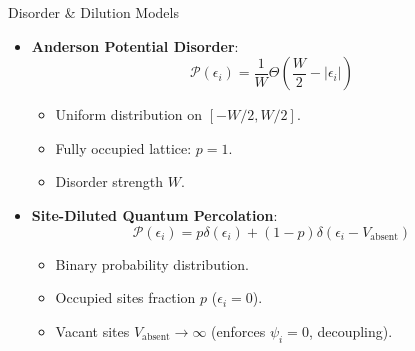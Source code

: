 \documentclass[10pt,aspectratio=169]{beamer}
\begin{document}
\begin{frame}{Disorder \& Dilution Models}
  \begin{itemize}
    \item \textbf{Anderson Potential Disorder}:
      \begin{equation}
      \mathcal{P}(\epsilon_i) = \frac{1}{W} \Theta\left(\frac{W}{2} - |\epsilon_i|\right)
      \end{equation}
      \begin{itemize}
        \item Uniform distribution on $[-W/2, W/2]$.
        \item Fully occupied lattice: $p=1$.
        \item Disorder strength $W$.
      \end{itemize}
    \vspace{0.4cm}
    \item \textbf{Site-Diluted Quantum Percolation}:
      \begin{equation}
      \mathcal{P}(\epsilon_i) = p \delta(\epsilon_i) + (1-p) \delta(\epsilon_i - V_{\text{absent}})
      \end{equation}
      \begin{itemize}
        \item Binary probability distribution.
        \item Occupied sites fraction $p$ ($\epsilon_i = 0$).
        \item Vacant sites $V_{\text{absent}} \to \infty$ (enforces $\psi_i = 0$, decoupling).
      \end{itemize}
  \end{itemize}
\end{frame}
\end{document}
